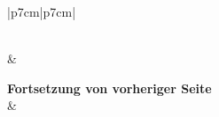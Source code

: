 \documentclass{../../inc/mybib}
\begin{document}
\renewcommand{\arraystretch}{1.3} %

\begin{longtable}{|p{7cm}|p{7cm}|}
    \caption{Biblische Argumente – Pro und Kontra Israel-Ersatz} \\
    \hline
     & 
     \\
    \hline
    \endfirsthead

    {{\bfseries Fortsetzung von vorheriger Seite}} \\
    \hline
     & 
     \\
    \hline
    \endhead

    \hline {} \\
    \endfoot

    \hline
    \endlastfoot


\end{longtable}
\end{document}
